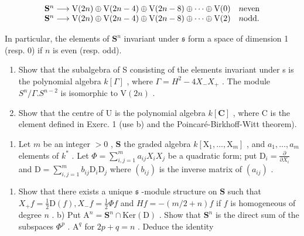\[
\begin{array}{l l} \mathbf {S} ^ {n} \longrightarrow \mathrm{V} (2 n) \oplus \mathrm{V} (2 n - 4) \oplus \mathrm{V} (2 n - 8) \oplus \dots \oplus \mathrm{V} (0) & n \text {even} \\ \mathbf {S} ^ {n} \longrightarrow \mathrm{V} (2 n) \oplus \mathrm{V} (2 n - 4) \oplus \mathrm{V} (2 n - 8) \oplus \dots \oplus \mathrm{V} (2) & n \text {odd}. \end{array}
\]

In particular, the elements of \(\mathbf{S}^n\) invariant under \(\mathfrak{s}\) form a space of dimension 1 (resp. 0) if \(n\) is even (resp. odd).

\begin{enumerate}
\def\labelenumi{\alph{enumi})}
\setcounter{enumi}{1}
\item
  Show that the subalgebra of S consisting of the elements invariant under s is the polynomial algebra \(k[\Gamma]\) , where \(\Gamma = H^{2} - 4X_{-}X_{+}\) . The module \(S^{n}/\Gamma.S^{n-2}\) is isomorphic to \(\mathrm{V}(2n)\) .
\item
  Show that the centre of U is the polynomial algebra \(k[\mathbf{C}]\) , where C is the element defined in Exerc. 1 (use b) and the Poincaré-Birkhoff-Witt theorem).
\end{enumerate}

\begin{enumerate}
\def\labelenumi{\arabic{enumi})}
\setcounter{enumi}{9}
\tightlist
\item
  Let \(m\) be an integer \(> 0\) , \(\mathbf{S}\) the graded algebra \(k[\mathrm{X}_1, \ldots, \mathrm{X}_m]\) , and \(a_1, \ldots, a_m\) elements of \(k^*\) . Let \(\Phi = \sum_{i,j=1}^{m} a_{ij} X_i X_j\) be a quadratic form; put \(\mathrm{D}_i = \frac{\partial}{\partial X_i}\) and \(\mathrm{D} = \sum_{i,j=1}^{m} b_{ij} \mathrm{D}_i \mathrm{D}_j\) where \((b_{ij})\) is the inverse matrix of \((a_{ij})\) .
\end{enumerate}

\begin{enumerate}
\def\labelenumi{\alph{enumi})}
\tightlist
\item
  Show that there exists a unique \(\mathfrak{s}\) -module structure on \(\mathbf{S}\) such that \(X_{+}f = \frac{1}{2}\mathrm{D}(f), X_{-}f = \frac{1}{2}\Phi f\) and \(Hf = -(m / 2 + n)f\) if \(f\) is homogeneous of degree \(n\) . b) Put \(\mathrm{A}^n = \mathbf{S}^n \cap \mathrm{Ker}(\mathrm{D})\) . Show that \(\mathbf{S}^n\) is the direct sum of the subspaces \(\Phi^p\) . \(\mathrm{A}^q\) for \(2p + q = n\) . Deduce the identity
\end{enumerate}

